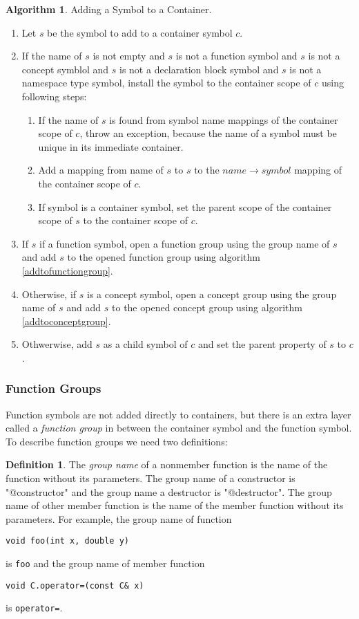 \documentclass[a4paper,oneside,11pt]{book}
\theoremstyle{definition}
\newtheorem{algo}{Algorithm}[section]
\newtheorem{defn}{Definition}[section]
\begin{document}
\begin{algo}\label{addsymboltocontainer} Adding a Symbol to a Container.
\begin{enumerate}
\item
Let $s$ be the symbol to add to a container symbol $c$.
\item
If the name of $s$ is not empty and $s$ is not a function symbol and $s$ is not a concept symblol and $s$ is not a declaration block symbol and
$s$ is not a namespace type symbol, install the symbol to the container scope of $c$ using following steps:
\begin{enumerate}
\item
If the name of $s$ is found from symbol name mappings of the container scope of $c$, throw an exception,
because the name of a symbol must be unique in its immediate container.
\item
Add a mapping from name of $s$ to $s$ to the $name \rightarrow symbol$ mapping of the container scope of $c$.
\item
If symbol is a container symbol, set the parent scope of the container scope of $s$ to the container scope of $c$.
\end{enumerate}
\item
If $s$ if a function symbol, open a function group using the group name of $s$ and add $s$ to the opened function group using algorithm
\ref{addtofunctiongroup}.
\item
Otherwise, if $s$ is a concept symbol, open a concept group using the group name of $s$ and add $s$ to the opened concept group using algorithm
\ref{addtoconceptgroup}.
\item
Othwerwise, add $s$ as a child symbol of $c$ and set the parent property of $s$ to $c$.
\end{enumerate}
\end{algo}

\subsubsection{Function Groups}

Function symbols are not added directly to containers, but there is an extra layer called a \emph{function group}
in between the container symbol and the function symbol. To describe function groups we need two definitions:

\begin{defn} The \emph{group name} of a nonmember function is the name of the function without its parameters.
The group name of a constructor is "@constructor" and the group name a destructor is "@destructor".
The group name of other member function is the name of the member function without its parameters.
For example, the group name of function
\begin{verbatim}
void foo(int x, double y)
\end{verbatim}
is \verb|foo| and the group name of member function
\begin{verbatim}
void C.operator=(const C& x)
\end{verbatim}
is \verb|operator=|.
\end{defn}
\end{document}
